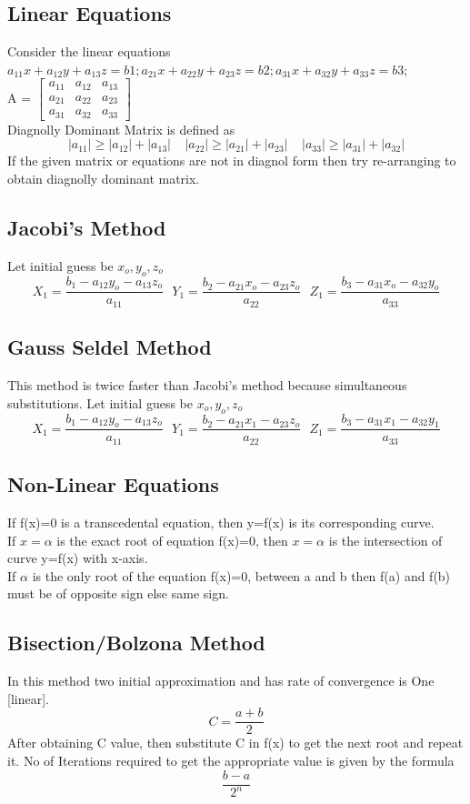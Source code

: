 \subsection{Linear Equations}
Consider the linear equations \(a_{11}x + a_{12}y + a_{13}z = b1; a_{21}x + a_{22}y + a_{23}z = b2; a_{31}x + a_{32}y + a_{33}z = b3;\)\\
A = 
$\begin{bmatrix}
a_{11} & a_{12} & a_{13}\\
a_{21} & a_{22} & a_{23}\\
a_{31} & a_{32} & a_{33}
\end{bmatrix}$\\
Diagnolly Dominant Matrix is defined as \[|a_{11}|\geq|a_{12}|+|a_{13}|\ \ \ \ \ |a_{22}|\geq|a_{21}|+|a_{23}|\ \ \ \ \ |a_{33}|\geq|a_{31}|+|a_{32}| \]
If the given matrix or equations are not in diagnol form then try re-arranging to obtain diagnolly dominant matrix.

\subsection*{Jacobi's Method}
Let initial guess be \(x_o, y_o, z_o\)
\[X_1=\frac{b_1-a_{12}y_o-a_{13}z_o}{a_{11}}\ \ \ Y_1=\frac{b_2-a_{21}x_o-a_{23}z_o}{a_{22}}\ \ \ Z_1=\frac{b_3-a_{31}x_o-a_{32}y_o}{a_{33}}\]

\subsection*{Gauss Seldel Method}
This method is twice faster than Jacobi's method because simultaneous substitutions. Let initial guess be \(x_o, y_o, z_o\)
\[X_1=\frac{b_1-a_{12}y_o-a_{13}z_o}{a_{11}}\ \ \ Y_1=\frac{b_2-a_{21}x_1-a_{23}z_o}{a_{22}}\ \ \ Z_1=\frac{b_3-a_{31}x_1-a_{32}y_1}{a_{33}}\]


\subsection{Non-Linear Equations}
If f(x)=0 is a transcedental equation, then y=f(x) is its corresponding curve.\\
If \(x = \alpha\) is the exact root of equation f(x)=0, then \(x=\alpha\) is the intersection of curve y=f(x) with x-axis.\\
If \(\alpha\) is the only root of the equation f(x)=0, between a and b then f(a) and f(b) must be of opposite sign else same sign.


\subsection*{Bisection/Bolzona Method}
In this method two initial approximation and has rate of convergence is One [linear].
\[C=\frac{a+b}{2}\]
After obtaining C value, then substitute C in f(x) to  get the next root and repeat it.
No of Iterations required to get the appropriate value is given by the formula
\[\frac{b-a}{2^n}\]

